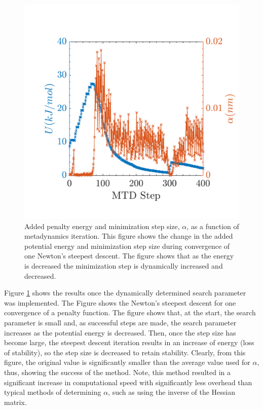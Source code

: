 \begin{figure}[h]
	\centering
	\includegraphics[width=.5\textwidth]{./Figures/MTD/dynamic_stepsize.pdf}
	\caption{Added penalty energy and minimization step size, $\alpha$, as a function of metadynamics iteration.  This figure shows the change in the added potential energy and minimization step size during convergence of one Newton's steepest descent.  The figure shows that as the energy is decreased the minimization step is dynamically increased and decreased.}
	\label{dynamic_stepsize}
\end{figure}

Figure \ref{dynamic_stepsize} shows the results once the dynamically determined search parameter was implemented.  The Figure shows the Newton's steepest descent for one convergence of a penalty function.  The figure shows that, at the start, the search parameter is small and, as successful steps are made, the search parameter increases as the potential energy is decreased.  Then, once the step size has become large, the steepest descent iteration results in an increase of energy (loss of stability), so the step size is decreased to retain stability.  Clearly, from this figure, the original value is significantly smaller than the average value used for $\alpha$, thus, showing the success of the method.  Note, this method resulted in a significant increase in computational speed with significantly less overhead than typical methods of determining $\alpha$, such as using the inverse of the Hessian matrix.

